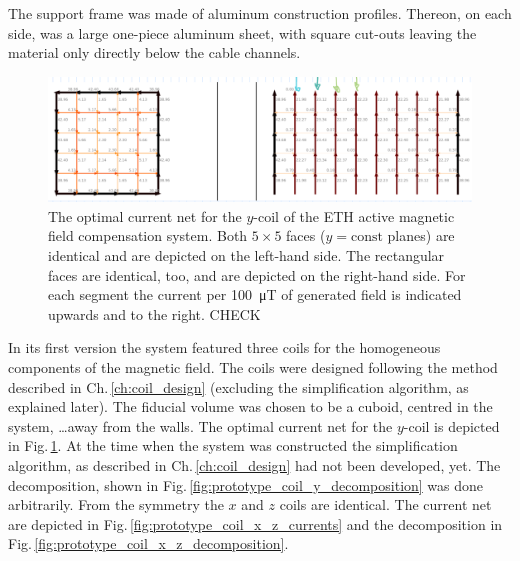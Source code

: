 The support frame was made of aluminum construction profiles. Thereon, on each side, was a large one-piece aluminum sheet, with square cut-outs leaving the material only directly below the cable channels. 

\begin{figure}
  \centering
  \includegraphics[width=0.9\linewidth]{gfx/prototype/coil_y_currents.png}
  \caption{The optimal current net for the $y$-coil of the ETH active magnetic field compensation system. Both $5 \times 5$ faces ($y = \mathrm{const}$ planes) are identical and are depicted on the left-hand side. The rectangular faces are identical, too, and are depicted on the right-hand side. For each segment the current per \SI{100}{\micro\tesla} of generated field is indicated upwards and to the right. CHECK}
  \label{fig:prototype_coil_y_currents}
\end{figure}

In its first version the system featured three coils for the homogeneous components of the magnetic field. The coils were designed following the method described in Ch.\,\ref{ch:coil_design} (excluding the simplification algorithm, as explained later). The fiducial volume was chosen to be a cuboid, centred in the system, \ldots away from the walls. The optimal current net for the $y$-coil is depicted in Fig.\,\ref{fig:prototype_coil_y_currents}. At the time when the system was constructed the simplification algorithm, as described in Ch.\,\ref{ch:coil_design} had not been developed, yet. The decomposition, shown in Fig.\,\ref{fig:prototype_coil_y_decomposition} was done arbitrarily. From the symmetry the $x$ and $z$ coils are identical. The current net are depicted in Fig.\,\ref{fig:prototype_coil_x_z_currents} and the decomposition in Fig.\,\ref{fig:prototype_coil_x_z_decomposition}.

